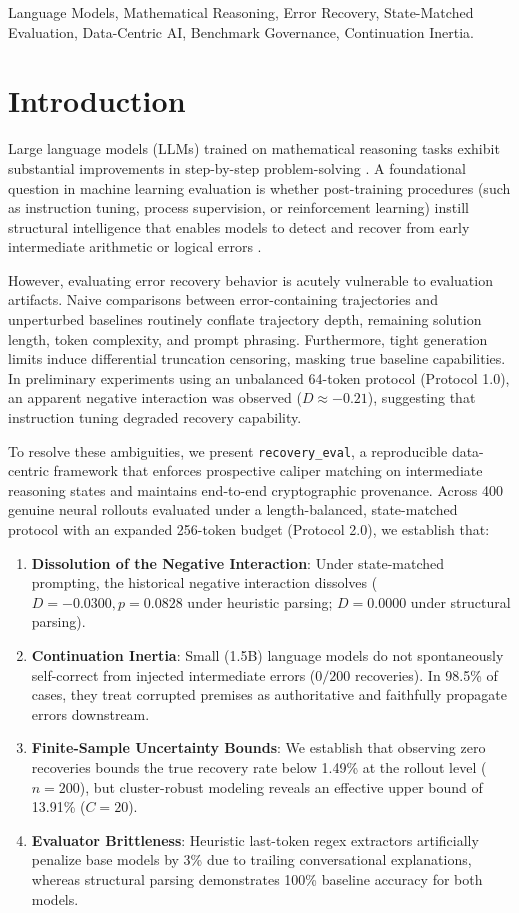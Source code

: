 \documentclass[10pt,conference]{IEEEtran}
\begin{document}
\begin{IEEEkeywords}
Language Models, Mathematical Reasoning, Error Recovery, State-Matched Evaluation, Data-Centric AI, Benchmark Governance, Continuation Inertia.
\end{IEEEkeywords}

\section{Introduction}
Large language models (LLMs) trained on mathematical reasoning tasks exhibit substantial improvements in step-by-step problem-solving \cite{cobbe2021gsm8k, qwen25math2024}. A foundational question in machine learning evaluation is whether post-training procedures (such as instruction tuning, process supervision, or reinforcement learning) instill structural intelligence that enables models to detect and recover from early intermediate arithmetic or logical errors \cite{lightman2023process, zelikman2022star}.

However, evaluating error recovery behavior is acutely vulnerable to evaluation artifacts. Naive comparisons between error-containing trajectories and unperturbed baselines routinely conflate trajectory depth, remaining solution length, token complexity, and prompt phrasing. Furthermore, tight generation limits induce differential truncation censoring, masking true baseline capabilities. In preliminary experiments using an unbalanced 64-token protocol (Protocol 1.0), an apparent negative interaction was observed ($D \approx -0.21$), suggesting that instruction tuning degraded recovery capability.

To resolve these ambiguities, we present \texttt{recovery\_eval}, a reproducible data-centric framework that enforces prospective caliper matching on intermediate reasoning states and maintains end-to-end cryptographic provenance. Across 400 genuine neural rollouts evaluated under a length-balanced, state-matched protocol with an expanded 256-token budget (Protocol 2.0), we establish that:
\begin{enumerate}
    \item \textbf{Dissolution of the Negative Interaction}: Under state-matched prompting, the historical negative interaction dissolves ($D = -0.0300, p = 0.0828$ under heuristic parsing; $D = 0.0000$ under structural parsing).
    \item \textbf{Continuation Inertia}: Small (1.5B) language models do not spontaneously self-correct from injected intermediate errors ($0/200$ recoveries). In 98.5\% of cases, they treat corrupted premises as authoritative and faithfully propagate errors downstream.
    \item \textbf{Finite-Sample Uncertainty Bounds}: We establish that observing zero recoveries bounds the true recovery rate below 1.49\% at the rollout level ($n=200$), but cluster-robust modeling reveals an effective upper bound of 13.91\% ($C=20$).
    \item \textbf{Evaluator Brittleness}: Heuristic last-token regex extractors artificially penalize base models by 3\% due to trailing conversational explanations, whereas structural parsing demonstrates 100\% baseline accuracy for both models.
\end{enumerate}
\end{document}
